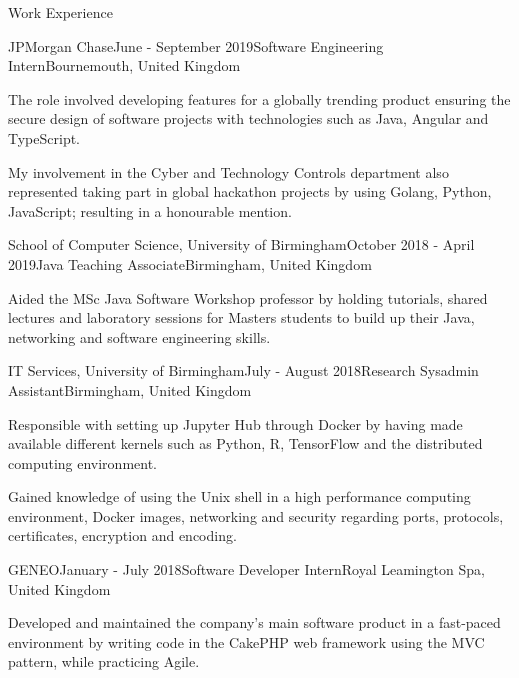 \documentclass{resume} %
\begin{document}
\begin{rSection}{Work Experience}

\begin{rSubsection}{JPMorgan Chase}{June - September 2019}{Software Engineering Intern}{Bournemouth, United Kingdom}
\item The role involved developing features for a globally trending product ensuring the secure design of software projects with technologies such as Java, Angular and TypeScript.
\item My involvement in the Cyber and Technology Controls department also represented taking part in global hackathon projects by using Golang, Python, JavaScript; resulting in a honourable mention.
\end{rSubsection}

\begin{rSubsection}{School of Computer Science, University of Birmingham}{October 2018 - April 2019}{Java Teaching Associate}{Birmingham, United Kingdom}
\item Aided the MSc Java Software Workshop professor by holding tutorials, shared lectures and laboratory sessions for Masters students to build up their Java, networking and software engineering skills.
\end{rSubsection}

\begin{rSubsection}{IT Services, University of Birmingham}{July - August 2018}{Research Sysadmin Assistant}{Birmingham, United Kingdom}
\item Responsible with setting up Jupyter Hub through Docker by having made available different kernels such as Python, R, TensorFlow and the distributed computing environment.
\item Gained knowledge of using the Unix shell in a high performance computing environment, Docker images, networking and security regarding ports, protocols, certificates, encryption and encoding.
\end{rSubsection}

\begin{rSubsection}{GENEO}{January - July 2018}{Software Developer Intern}{Royal Leamington Spa, United Kingdom}
\item Developed and maintained the company’s main software product in a fast-paced environment by writing code in the CakePHP web framework using the MVC pattern, while practicing Agile.
\end{rSubsection}


\end{rSection}
\end{document}
